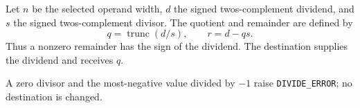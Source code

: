 Let \(n\) be the selected operand width, \(d\) the signed two\textquotesingle{}s-complement dividend, and \(s\) the signed two\textquotesingle{}s-complement divisor. The quotient and remainder are defined by
\[
  q = \operatorname{trunc}(d/s),
  \qquad r = d - qs .
\]
Thus a nonzero remainder has the sign of the dividend. The destination supplies the dividend and receives \(q\).

A zero divisor and the most-negative value divided by \(-1\) raise \texttt{DIVIDE\_ERROR}; no destination is changed.
